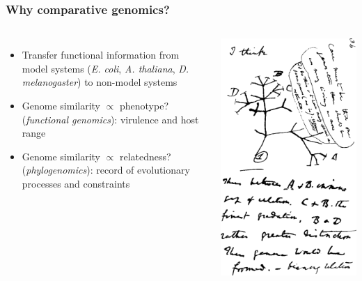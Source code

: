 
\begin{frame}
  \frametitle{Why comparative genomics?}
    \begin{columns}[c] 
        \begin{itemize}
         \item \textcolor{hutton_green}{Transfer functional information from model systems (\textit{E. coli}, \textit{A. thaliana}, \textit{D. melanogaster}) to non-model systems}        
         \item \textcolor{hutton_blue}{Genome similarity $\propto$ phenotype? (\textit{functional genomics}): virulence and host range}         
         \item \textcolor{RawSienna}{Genome similarity $\propto$ relatedness? (\textit{phylogenomics}): record of evolutionary processes and constraints}
        \end{itemize}
        \includegraphics[width=\textwidth]{images/darwin_tree}

\end{columns}
\end{frame}
